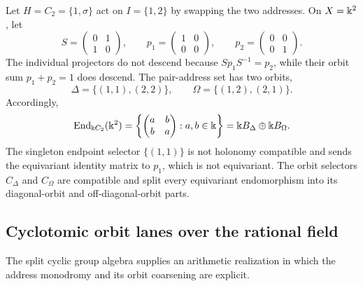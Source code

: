 \begin{example}
\label{ex:block16-c2-swap}
Let \(H=C_2=\{1,\sigma\}\) act on \(I=\{1,2\}\) by swapping the two addresses.
On \(X=\Bbbk^2\), let
\[
 S=
 \begin{pmatrix}0&1\\1&0\end{pmatrix},
 \qquad
 p_1=
 \begin{pmatrix}1&0\\0&0\end{pmatrix},
 \qquad
 p_2=
 \begin{pmatrix}0&0\\0&1\end{pmatrix}.
\]
The individual projectors do not descend because
\(Sp_1S^{-1}=p_2\), while their orbit sum \(p_1+p_2=1\) does descend.  The
pair-address set has two orbits,
\[
 \Delta=\{(1,1),(2,2)\},
 \qquad
 \Omega=\{(1,2),(2,1)\}.
\]
Accordingly,
\[
 \operatorname{End}_{\Bbbk C_2}(\Bbbk^2)
 =
 \left\{
 \begin{pmatrix}a&b\\b&a\end{pmatrix}:a,b\in\Bbbk
 \right\}
 =
 \Bbbk B_\Delta\oplus\Bbbk B_\Omega.
\]
The singleton endpoint selector \(\{(1,1)\}\) is not holonomy compatible and
sends the equivariant identity matrix to \(p_1\), which is not equivariant.
The orbit selectors \(C_\Delta\) and \(C_\Omega\) are compatible and split every
equivariant endomorphism into its diagonal-orbit and off-diagonal-orbit parts.
\end{example}

\subsection{Cyclotomic orbit lanes over the rational field}
\label{subsec:block16-cyclotomic-orbit-lanes}

The split cyclic group algebra supplies an arithmetic realization in which the
address monodromy and its orbit coarsening are explicit.

